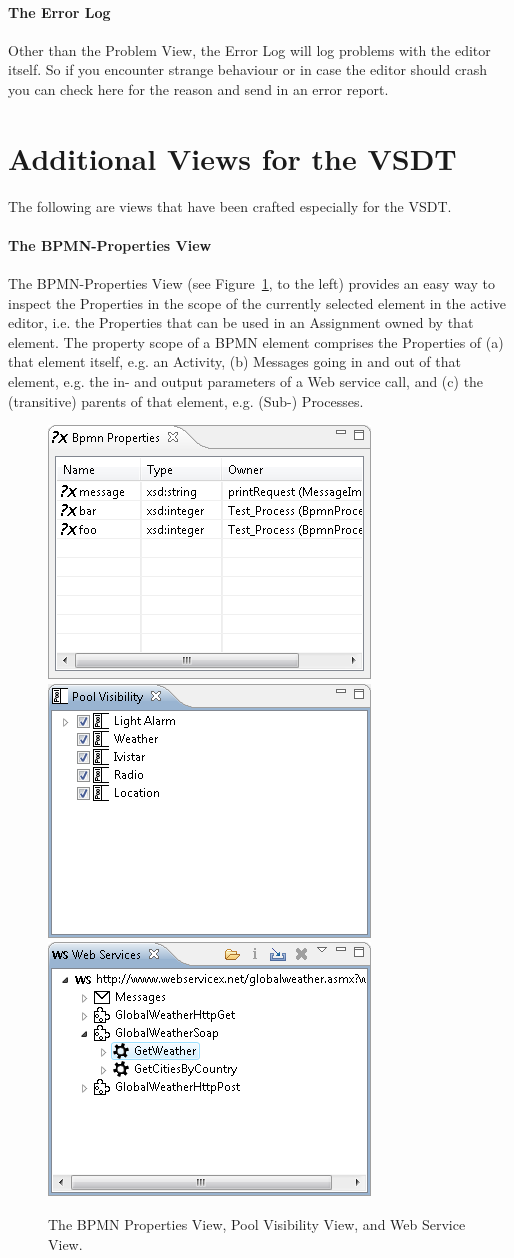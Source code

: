 \paragraph*{The Error Log}
Other than the Problem View, the Error Log will log problems with the editor itself. So if you encounter strange behaviour or in case the editor should crash you can check here for the reason and send in an error report.



\section{Additional Views for the VSDT}
\label{sec:user_perspective_custom}

The following are views that have been crafted especially for the VSDT.


\paragraph*{The BPMN-Properties View}
\label{sec:user_perspective_propView}

The BPMN-Properties View (see Figure~\ref{fig:customViews}, to the left) provides an easy way to inspect the Properties in the scope of the currently selected element in the active editor, i.e. the Properties that can be used in an Assignment owned by that element. The property scope of a BPMN element comprises the Properties of (a) that element itself, e.g. an Activity, (b) Messages going in and out of that element, e.g. the in- and output parameters of a Web service call, and (c) the (transitive) parents of that element, e.g. (Sub-) Processes.

\begin{figure}[t]
	\centering
	\includegraphics[width=.3\textwidth]{figures/features/propView.png}
	\hspace{.5cm}
	\includegraphics[width=.3\textwidth]{figures/features/poolView.png}
	\hspace{.5cm}
	\includegraphics[width=.3\textwidth]{figures/features/wsView.png}
	\caption{The BPMN Properties View, Pool Visibility View, and Web Service View.}
	\label{fig:customViews}
\end{figure}

